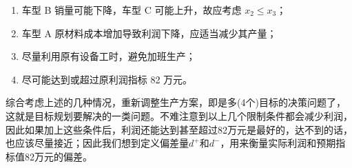     \begin{enumerate}
        \item 车型 B 销量可能下降，车型 C 可能上升，故应考虑 \( x_2 \leq x_3 \)；
        \item 车型 A 原材料成本增加导致利润下降，应适当减少其产量；
        \item 尽量利用原有设备工时，避免加班生产；
        \item 尽可能达到或超过原利润指标 82 万元。
    \end{enumerate}
    综合考虑上述的几种情况，重新调整生产方案，即是多(4个)目标的决策问题了，这就是目标规划要解决的一类问题。不难注意到以上几个限制条件都会减少利润，因此如果加上这些条件后，利润还能达到甚至超过82万元是最好的，达不到的话，也应该尽量接近；因此我们想到定义偏差量$d^+$和$d^-$，用来衡量实际利润和预期指标值82万元的偏差。
    
